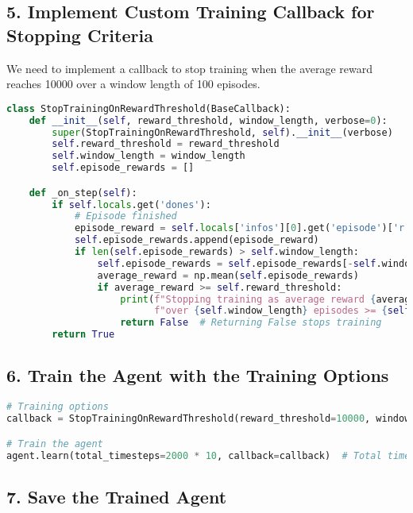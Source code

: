 \documentclass[12pt]{article}
\begin{document}
\subsection*{5. Implement Custom Training Callback for Stopping Criteria}

We need to implement a callback to stop training when the average reward reaches 10000 over a window length of 100 episodes.

\begin{lstlisting}[language=Python, breaklines=true]
class StopTrainingOnRewardThreshold(BaseCallback):
    def __init__(self, reward_threshold, window_length, verbose=0):
        super(StopTrainingOnRewardThreshold, self).__init__(verbose)
        self.reward_threshold = reward_threshold
        self.window_length = window_length
        self.episode_rewards = []

    def _on_step(self):
        if self.locals.get('dones'):
            # Episode finished
            episode_reward = self.locals['infos'][0].get('episode')['r']
            self.episode_rewards.append(episode_reward)
            if len(self.episode_rewards) > self.window_length:
                self.episode_rewards = self.episode_rewards[-self.window_length:]
                average_reward = np.mean(self.episode_rewards)
                if average_reward >= self.reward_threshold:
                    print(f"Stopping training as average reward {average_reward} "
                          f"over {self.window_length} episodes >= {self.reward_threshold}")
                    return False  # Returning False stops training
        return True
\end{lstlisting}

\subsection*{6. Train the Agent with the Training Options}

\begin{lstlisting}[language=Python, breaklines=true]
# Training options
callback = StopTrainingOnRewardThreshold(reward_threshold=10000, window_length=100)

# Train the agent
agent.learn(total_timesteps=2000 * 10, callback=callback)  # Total timesteps equivalent to MaxEpisodes * MaxStepsPerEpisode
\end{lstlisting}

\subsection*{7. Save the Trained Agent}
\end{document}
